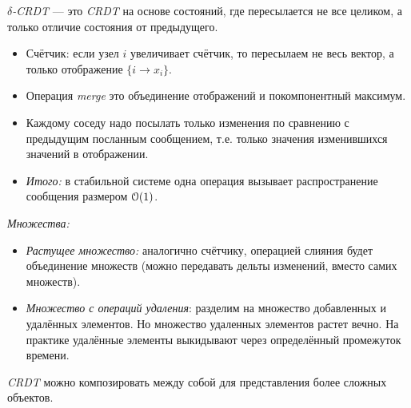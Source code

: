 \begin{definition}
    $\delta$\textit{-CRDT} --- это \textit{CRDT} на основе состояний, где пересылается не
    все целиком, а только отличие состояния от предыдущего.
\end{definition}

\begin{example}
    \enewline
    \begin{itemize}
        \item Счётчик: если узел $i$ увеличивает счётчик, то пересылаем не весь вектор,
            а только отображение $\{i \to x_i\}$.
        \item Операция \textit{merge} это объединение отображений и покомпонентный максимум.
        \item Каждому соседу надо посылать только изменения по сравнению с предыдущим посланным
            сообщением, т.е. только значения изменившихся значений в отображении.
        \item \textit{Итого:} в стабильной системе одна операция вызывает распространение
            сообщения размером $\mathcal{O}(1)$.
    \end{itemize}
\end{example}

\begin{examples} \textit{Множества:}
    \begin{itemize}
        \item \textit{Растущее множество:} аналогично счётчику, операцией слияния будет
            объединение множеств (можно передавать дельты изменений, вместо самих множеств).
        \item \textit{Множество с операций удаления}: разделим на множество добавленных и
            удалённых элементов. Но множество удаленных элементов растет вечно. На практике
            удалённые элементы выкидывают через определённый промежуток времени.
    \end{itemize}
\end{examples}

\begin{remark}
    \textit{CRDT} можно композировать между собой для представления более сложных объектов.
\end{remark}
